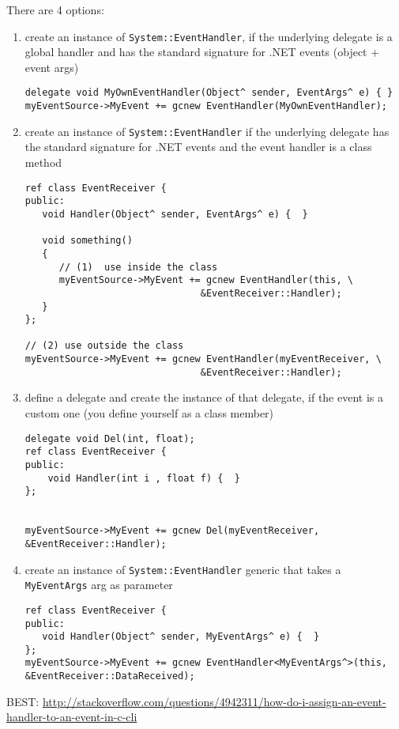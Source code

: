 There are 4 options:
\begin{enumerate}
  \item create an instance of \verb!System::EventHandler!, if the underlying
  delegate is a global handler and has the standard signature for .NET events
  (object + event args)
  
\begin{verbatim}
delegate void MyOwnEventHandler(Object^ sender, EventArgs^ e) { }  
myEventSource->MyEvent += gcnew EventHandler(MyOwnEventHandler); 
\end{verbatim}
  
  \item create an instance of \verb!System::EventHandler! if the underlying
  delegate has the standard signature for .NET events and the event handler is a
  class method
\begin{verbatim}
ref class EventReceiver {
public:
   void Handler(Object^ sender, EventArgs^ e) {  }
   
   void something()
   {
      // (1)  use inside the class
      myEventSource->MyEvent += gcnew EventHandler(this, \
                               &EventReceiver::Handler);
   }
};

// (2) use outside the class
myEventSource->MyEvent += gcnew EventHandler(myEventReceiver, \
                               &EventReceiver::Handler);
\end{verbatim}
  
  \item define a delegate and create the instance of that delegate, if the event
  is a custom one (you define yourself as a class member)
  
\begin{verbatim}
delegate void Del(int, float);
ref class EventReceiver {
public:
    void Handler(int i , float f) {  }
};


myEventSource->MyEvent += gcnew Del(myEventReceiver, &EventReceiver::Handler);
\end{verbatim}

  \item create an instance of \verb!System::EventHandler! generic that takes
  a \verb!MyEventArgs! arg as parameter
\begin{verbatim}
ref class EventReceiver {
public:
   void Handler(Object^ sender, MyEventArgs^ e) {  }
};
myEventSource->MyEvent += gcnew EventHandler<MyEventArgs^>(this, &EventReceiver::DataReceived);
\end{verbatim}
\end{enumerate}
BEST:
\url{http://stackoverflow.com/questions/4942311/how-do-i-assign-an-event-handler-to-an-event-in-c-cli}


